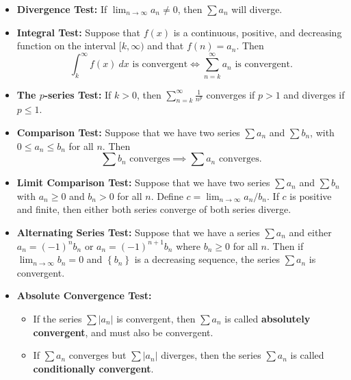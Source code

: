 \documentclass{article}
\newenvironment{bx}[1][]{
\begin{tcolorbox}[colback=white!97!black, title=#1, arc=0in, halign=flush left, left=1mm, right=1mm,]
}{
\end{tcolorbox}
}
\begin{document}
\begin{multicols}{2}
\begin{bx}[Riemann Sums]
\end{bx}
\columnbreak

\begin{bx}[Test for Convergence and Divergence]

\begin{itemize}[leftmargin=1em]

\item \textbf{Divergence Test:} If $\displaystyle \lim_{n\to\infty}a_n\neq 0$, then $\sum a_n$ will diverge.\\

\item \textbf{Integral Test:}
Suppose that $f(x)$ is a continuous, positive, and decreasing function on the interval $[k,\infty)$ and that $f(n)=a_n$. Then
$$\int_k^\infty f(x)\ dx\text{ is convergent} \iff \sum_{n=k}^\infty a_n\text{ is convergent}.$$


\item \textbf{The $p$-series Test:}
 If $k>0$, then $\sum_{n=k}^\infty\frac{1}{n^p}$ converges if $p>1$ and diverges if $p\leq 1$.


\item \textbf{Comparison Test:}
 Suppose that we have two series $\sum a_n$ and $\sum b_n$, with $0\leq a_n\leq b_n$ for all $n$. Then
 $$\sum b_n\text{ converges}\implies \sum a_n\text{ converges}.$$


\item \textbf{Limit Comparison Test:}
Suppose that we have two series $\sum a_n$ and $\sum b_n$ with $a_n\geq 0$ and $b_n > 0$ for all $n$. Define $c=\lim_{n\to\infty}{a_n}/{b_n}.$ If $c$ is positive and finite, then either both series converge of both series diverge.


\item \textbf{Alternating Series Test:}
Suppose that we have a series $\sum a_{n}$ and either $a_{n}=(-1)^{n} b_{n}$ or $a_{n}=(-1)^{n+1} b_{n}$ where $b_{n} \geq 0$ for all $n .$ Then if ${\displaystyle\lim _{n \to \infty}} b_{n}=0$ and $\left\{b_{n}\right\}$ is a decreasing sequence, the series $\sum a_{n}$ is convergent.


\item \textbf{Absolute Convergence Test:}
\phantom{}
\begin{itemize}[leftmargin=1em]
    \item If the series $\sum |a_n|$ is convergent, then $\sum a_n$ is called \textbf{absolutely convergent}, and must also be convergent.
    \item If $\sum a_n$ converges but $\sum |a_n|$ diverges, then the series $\sum a_n$ is called \textbf{conditionally convergent}.
\end{itemize}



\end{itemize}
\end{bx}
\end{multicols}
\end{document}
